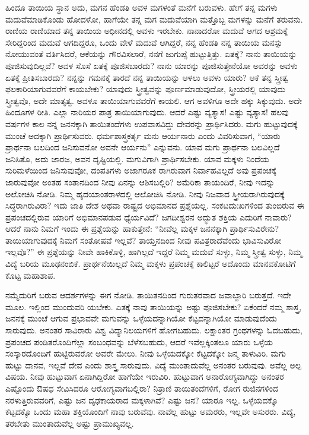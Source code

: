 ಹಿಂದೂ ತಾಯಿಯ ಸ್ಥಾನ ಅದು, ಮಗನ ಹೆಂಡತಿ ಅವಳ ಮಗಳಂತೆ ಮನೆಗೆ ಬರುವಳು. ಹೇಗೆ ತನ್ನ ಮಗಳು ಮದುವೆಮಾಡಿಕೊಂಡು ಹೋದಳೋ, ಹಾಗೆಯೇ ತನ್ನ ಮಗ ಮದುವೆಯಾಗಿ ಮತ್ತೊಬ್ಬ ಮಗಳನ್ನು ಮನೆಗೆ ತರುವನು. ರಾಣಿಯ ರಾಣಿಯಾದ ತನ್ನ ತಾಯಿಯ ಅಧೀನದಲ್ಲಿ ಅವಳು ಇರಬೇಕು. ನಾನಾದರೋ ಮದುವೆ ಆಗದ ಆಶ್ರಮಕ್ಕೆ ಸೇರಿದ್ದರಿಂದ ಮದುವೆ ಆಗದಿದ್ದರೂ, ಒಂದು ವೇಳೆ ಮದುವೆ ಆಗಿದ್ದರೆ, ನನ್ನ ಹೆಂಡತಿ ನನ್ನ ತಾಯಿಯ ಮನಸ್ಸು ನೋಯುವಂತೆ ವರ್ತಿಸಿದರೆ, ಆಕೆಯನ್ನು ಗೌರವಿಸಲಾರೆ, ನನಗೆ ಜುಗುಪ್ಸೆ ಹುಟ್ಟುತ್ತಿತ್ತು. ಏತಕ್ಕೆ? ನಾನು ತಾಯಿಯನ್ನು ಪೂಜಿಸುವುದಿಲ್ಲವೆ? ಅವಳ ಸೊಸೆ ಏತಕ್ಕೆ ಪೂಜಿಸಬಾರದು? ನಾನು ಯಾರನ್ನು ಪೂಜಿಸುತ್ತೇನೆಯೋ ಅವರನ್ನು ಅವಳು ಏತಕ್ಕೆ ಪ್ರೀತಿಸಬಾರದು? ನನ್ನನ್ನು ಗಮನಕ್ಕೆ ತಾರದೆ ನನ್ನ ತಾಯಿಯನ್ನು ಆಳಲು ಅವಳು ಯಾರು? ಆಕೆ ತನ್ನ ಸ್ತ್ರೀತ್ವ ಫಲಕಾರಿಯಾಗುವವರೆಗೆ ಕಾಯಬೇಕು? ಯಾವುದು ಸ್ತ್ರೀತ್ವವನ್ನು ಪೂರ್ಣಮಾಡುವುದೋ, ಸ್ತ್ರೀಯರಲ್ಲಿ ಯಾವುದು ಸ್ತ್ರೀತ್ವವೊ, ಅದೇ ಮಾತೃತ್ವ. ಅವಳೂ ತಾಯಿಯಾಗುವವರೆಗೆ ಕಾಯಲಿ. ಆಗ ಅವಳಿಗೂ ಅದೇ ಹಕ್ಕು ಸಿಕ್ಕುವುದು. ಅದೇ ಹಿಂದೂಗಳ ರೀತಿ. ಎಲ್ಲಾ ನಾರಿಯರ ಪಾತ್ರ ತಾಯಿಯಾಗುವುದು. ಆದರೆ ಎಷ್ಟು ವ್ಯತ್ಯಾಸ! ಎಷ್ಟು ವ್ಯತ್ಯಾಸ! ಹಲವು ವರ್ಷಗಳ ಕಾಲ ನನ್ನ ಜನನಕ್ಕಾಗಿ ತಾಯಿತಂದೆಗಳು ಉಪವಾಸವಿದ್ದು ದೇವರನ್ನು ಪ್ರಾರ್ಥಿಸಿದರು. ಮಗು ಹುಟ್ಟುವುದಕ್ಕೆ ಮುಂಚೆ ಅದಕ್ಕಾಗಿ ಪ್ರಾರ್ಥಿಸುವರು. ಧರ್ಮಶಾಸ್ತ್ರಕರ್ತೃ ಮನು ಆರ್ಯನಾರು ಎಂದು ವಿವರಿಸುವಾಗ, “ಯಾರು ಪ್ರಾರ್ಥನಾ ಬಲದಿಂದ ಜನಿಸುವನೋ ಅವನೇ ಆರ್ಯನು” ಎನ್ನುವನು. ಯಾವ ಮಗು ಪ್ರಾರ್ಥನಾ ಬಲವಿಲ್ಲದೆ ಜನಿಸಿತೊ, ಅದು ಜಾರಜ, ಅವನ ದೃಷ್ಟಿಯಲ್ಲಿ. ಮಗುವಿಗಾಗಿ ಪ್ರಾರ್ಥಿಸಬೇಕು. ಯಾವ ಮಕ್ಕಳು ನಿಂದೆಯ ಸುರಿಮಳೆಯಿಂದ ಜನಿಸುವುವೋ, ದಂಪತಿಗಳು ಅಜಾಗರೂಕ ರಾಗಿರುವಾಗ ನಿರ್ವಾಹವಿಲ್ಲದೆ ಅವು ಪ್ರಪಂಚಕ್ಕೆ ಜಾರುವುವೋ ಅಂತಹ ಸಂತಾನದಿಂದ ನೀವು ಏನನ್ನು ಆಶಿಸಬಲ್ಲಿರಿ? ಅಮೆರಿಕಾ ತಾಯಂದಿರೆ, ನೀವು ಇದನ್ನು ಅಲೋಚಿಸಿ ನೋಡಿ. ನಿಮ್ಮ ಹೃದಯಾಂತರಾಳದಲ್ಲಿ ಆಲೋಚಿಸಿ ನೋಡಿ. ನೀವು ನಿಜವಾದ ಸ್ತ್ರೀಯರಾಗಿರುವುದಕ್ಕೆ ಸಿದ್ಧರಾಗಿರುವಿರಾ? ಇದು ಜಾತಿ ದೇಶ ಅಥವಾ ರಾಷ್ಟ್ರದ ಅಭಿಮಾನದ ಪ್ರಶ್ನೆಯಲ್ಲ. ಸಂಕಟದುಃಖಗಳಿಂದ ತುಂಬಿರುವ ಈ ಪ್ರಪಂಚದಲ್ಲಿರುವ ಯಾರಿಗೆ ಅಭಿಮಾನಪಡುವ ಧ್ಯೆರ್ಯವಿದೆ? ಜಗದೀಶ್ವರನ ಅದ್ಭುತ ಶಕ್ತಿಯ ಎದುರಿಗೆ ನಾವಾರು? ಆದರೆ ನಾನು ನಿಮಗೆ ಇಂದು ಈ ಪ್ರಶ್ನೆಯನ್ನು ಹಾಕುತ್ತೇನೆ: “ನೀವೆಲ್ಲ ಮಕ್ಕಳ ಜನನಕ್ಕಾಗಿ ಪ್ರಾರ್ಥಿಸುವಿರೇನು? ತಾಯಿಯಾಗುವುದಕ್ಕೆ ನಿಮಗೆ ಸಂತೋಷವೆ ಇಲ್ಲವೆ? ತಾಯ್ತನದಿಂದ ನೀವು ಪವಿತ್ರರಾದೆವೆಂದು ಭಾವಿಸುವಿರೋ ಇಲ್ಲವೊ?” ಈ ಪ್ರಶ್ನೆಯನ್ನು ನೀವೇ ಹಾಕಿಕೊಳ್ಳಿ, ಹಾಗಿಲ್ಲದೆ ಇದ್ದರೆ ನಿಮ್ಮ ಮದುವೆ ಸುಳ್ಳು, ನಿಮ್ಮ ಸ್ತ್ರೀತ್ವ ಸುಳ್ಳು, ನಿಮ್ಮ ವಿದ್ಯೆ ಬರಿಯ ಮೂಢನಂಬಿಕೆ. ಪ್ರಾರ್ಥನೆಯಿಲ್ಲದೆ ನಿಮ್ಮ ಮಕ್ಕಳು ಪ್ರಪಂಚಕ್ಕೆ ಕಾಲಿಟ್ಟರೆ ಅದೊಂದು ಮಾನವಕೋಟಿಗೆ ಕೊಟ್ಟ ಮಹಾಶಾಪ.

ನಮ್ಮೆದುರಿಗೆ ಬರುವ ಆದರ್ಶಗಳನ್ನು ಈಗ ನೋಡಿ. ತಾಯಿತನದಿಂದ ಗುರುತರವಾದ ಜವಾಬ್ದಾರಿ ಬರುತ್ತದೆ. ಇದೇ ಮೂಲ. ಇಲ್ಲಿಂದ ಮುಂದುವರಿ ಯಬೇಕು. ಏತಕ್ಕೆ ನಾವು ತಾಯಿಯನ್ನು ಅಷ್ಟು ಪೂಜಿಸಬೇಕು? ಏಕೆಂದರೆ ನಮ್ಮ ಶಾಸ್ತ್ರ, ಜನನಕ್ಕೆ ಮುಂಚೆ ಆಗುವ ಪ್ರಭಾವವೇ ಮಗುವನ್ನು ಒಳ್ಳೆಯದನ್ನಾಗಿಯೋ ಕೆಟ್ಟದನ್ನಾಗಿಯೋ ಮಾಡುವುದೆಂದು ಸಾರುವುದು. ಅನಂತರ ಸಾವಿರಾರು ವಿಶ್ವ ವಿದ್ಯಾನಿಲಯಗಳಿಗೆ ಹೋಗಬಹುದು. ಲಕ್ಷಾಂತರ ಗ್ರಂಥಗಳನ್ನು ಓದಬಹುದು, ಪ್ರಪಂಚದ ಪಂಡಿತರೊಂದಿಗೆಲ್ಲಾ ಸಂಬಂಧವನ್ನು ಬೆಳೆಸಬಹುದು, ಆದರೆ ಇವೆಲ್ಲಕ್ಕಿಂತಲೂ ಯಾರು ಒಳ್ಳೆಯ ಸಂಸ್ಕಾರದೊಂದಿಗೆ ಹುಟ್ಟಿರುವರೋ ಅವರೇ ಮೇಲು. ನೀವು ಒಳ್ಳೆಯದಕ್ಕೋ ಕೆಟ್ಟದಕ್ಕೋ ಜನ್ಮ ತಾಳುವಿರಿ. ಮಗು ಹುಟ್ಟು ದಾನವ, ಇಲ್ಲವೆ ದೇವ ಎಂದು ಶಾಸ್ತ್ರ ಸಾರುವುದು. ವಿದ್ಯೆ ಮುಂತಾದುವೆಲ್ಲ ಅನಂತರ ಬರುವುವು. ಅವೆಲ್ಲ ಅಲ್ಪ ವಿಷಯ. ನೀವು ಹುಟ್ಟುವಾಗ ಏನಾಗಿದ್ದಿರೋ ಹಾಗೆಯೇ ಇರುವಿರಿ. ಹುಟ್ಟುವಾಗ ಅನಾರೋಗ್ಯವಾಗಿದ್ದು ಅನಂತರ ಎಷ್ಟೊಂದು ಔಷಧ ಸೇವಿಸಿದರೂ ಆರೋಗ್ಯವಾಗಬಲ್ಲಿರಾ? ನಿತ್ರಾಣಿ ತಾಯಿತಂದೆಗಳಿಗೆ, ರೋಗ ರುಜಿನಗಳಿಂದ ನರಳುತ್ತಿರುವವರಿಗೆ, ಎಷ್ಟು ಜನ ದೃಢಕಾಯರಾದ ಮಕ್ಕಳಾಗಿವೆ? ಎಷ್ಟು ಜನ? ಯಾರೂ ಇಲ್ಲ. ಒಳ್ಳೆಯದಕ್ಕೊ ಕೆಟ್ಟದಕ್ಕೊ ಒಂದು ಮಹಾ ಶಕ್ತಿಯೊಂದಿಗೆ ನಾವು ಬರುವೆವು. ನಾವೆಲ್ಲ ಹುಟ್ಟು ಅಮರರು, ಇಲ್ಲವೇ ಅಸುರರು. ವಿದ್ಯೆ, ತರಬೇತು ಮುಂತಾದುವೆಲ್ಲ ಅಷ್ಟು ಪ್ರಾಮುಖ್ಯವಲ್ಲ.

